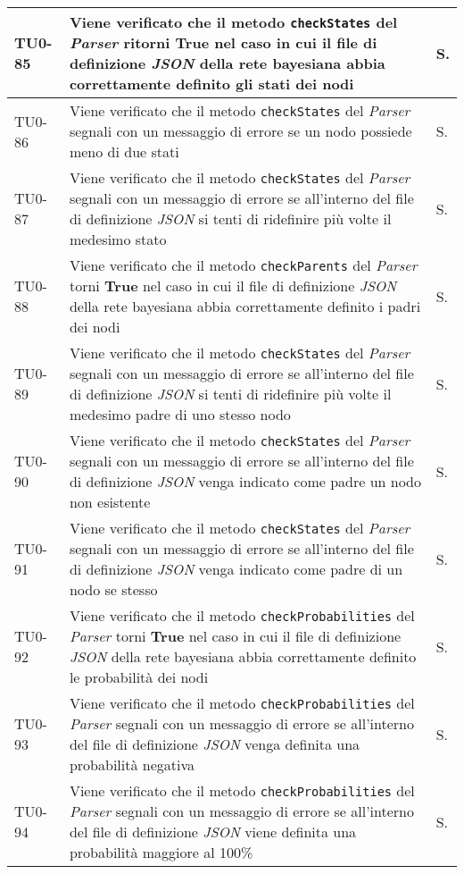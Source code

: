 \begin{longtable}{|C{.15\textwidth}|m{.66\textwidth}|C{.10\textwidth}|}
\hline
{}TU0-85 & Viene verificato che il metodo \texttt{checkStates} del \textit{Parser} ritorni \textbf{True} nel caso in cui il file di definizione \textit{JSON} della rete bayesiana abbia correttamente definito gli stati dei nodi & S.\\
\hline
TU0-86 & Viene verificato che il metodo \texttt{checkStates} del \textit{Parser} segnali con un messaggio di errore se un nodo possiede meno di due stati & S.\\
\hline
{}TU0-87 & Viene verificato che il metodo \texttt{checkStates} del \textit{Parser} segnali con un messaggio di errore se all'interno del file di definizione \textit{JSON} si tenti di ridefinire più volte il medesimo stato & S.\\
\hline
TU0-88 & Viene verificato che il metodo \texttt{checkParents} del \textit{Parser} torni \textbf{True} nel caso in cui il file di definizione \textit{JSON} della rete bayesiana abbia correttamente definito i padri dei nodi & S.\\
\hline
{}TU0-89 & Viene verificato che il metodo \texttt{checkStates} del \textit{Parser} segnali con un messaggio di errore se all'interno del file di definizione \textit{JSON} si tenti di ridefinire più volte il medesimo padre di uno stesso nodo & S.\\
\hline
TU0-90 & Viene verificato che il metodo \texttt{checkStates} del \textit{Parser} segnali con un messaggio di errore se all'interno del file di definizione \textit{JSON} venga indicato come padre un nodo non esistente & S.\\
\hline
{}TU0-91 & Viene verificato che il metodo \texttt{checkStates} del \textit{Parser} segnali con un messaggio di errore se all'interno del file di definizione \textit{JSON} venga indicato come padre di un nodo se stesso & S.\\
\hline
TU0-92 & Viene verificato che il metodo \texttt{checkProbabilities} del \textit{Parser} torni \textbf{True} nel caso in cui il file di definizione \textit{JSON} della rete bayesiana abbia correttamente definito le probabilità dei nodi & S.\\
\hline
{}TU0-93 & Viene verificato che il metodo \texttt{checkProbabilities} del \textit{Parser} segnali con un messaggio di errore se all'interno del file di definizione \textit{JSON} venga definita una probabilità negativa & S.\\
\hline
TU0-94 & Viene verificato che il metodo \texttt{checkProbabilities} del \textit{Parser} segnali con un messaggio di errore se all'interno del file di definizione \textit{JSON} viene definita una probabilità maggiore al 100\% & S.\\

\end{longtable}
